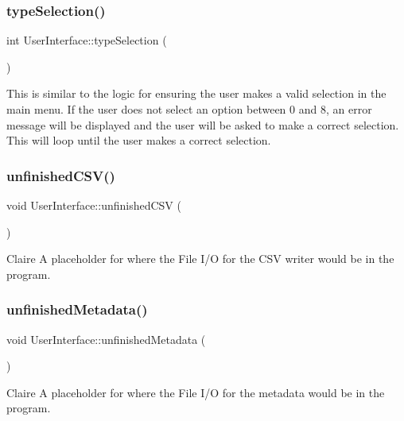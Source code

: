\subsubsection{\texorpdfstring{type\+Selection()}{typeSelection()}}
{\footnotesize\ttfamily int User\+Interface\+::type\+Selection (\begin{DoxyParamCaption}{ }\end{DoxyParamCaption})}

This is similar to the logic for ensuring the user makes a valid selection in the main menu. If the user does not select an option between 0 and 8, an error message will be displayed and the user will be asked to make a correct selection. This will loop until the user makes a correct selection. \mbox{\label{classUserInterface_ab7b18b692475bb7f0e420b6c45f68964}} 
\subsubsection{\texorpdfstring{unfinished\+C\+S\+V()}{unfinishedCSV()}}
{\footnotesize\ttfamily void User\+Interface\+::unfinished\+C\+SV (\begin{DoxyParamCaption}{ }\end{DoxyParamCaption})}

Claire A placeholder for where the File I/O for the C\+SV writer would be in the program. \mbox{\label{classUserInterface_ae0937ae35d829ae8e97fac892106a794}} 
\subsubsection{\texorpdfstring{unfinished\+Metadata()}{unfinishedMetadata()}}
{\footnotesize\ttfamily void User\+Interface\+::unfinished\+Metadata (\begin{DoxyParamCaption}{ }\end{DoxyParamCaption})}

Claire A placeholder for where the File I/O for the metadata would be in the program. \mbox{\label{classUserInterface_a6e5d84fffdada2902b796774249a35e8}} 
